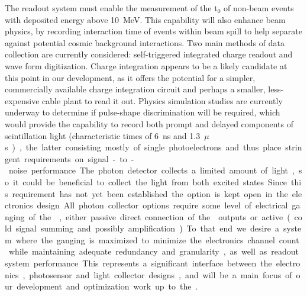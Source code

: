 The readout system must enable the measurement of the t$_0$ of non-beam events with deposited energy above \SI{10}{MeV}. 
This capability will also enhance beam physics, by recording interaction time of events within 
beam spill to help separate against potential cosmic background interactions. Two main methods of data collection are currently considered:  self-triggered integrated charge readout and wave form digitization.  Charge integration appears to be a likely candidate at this point in our development, as it offers the potential for a simpler, commercially available charge integration circuit and perhaps a smaller, less-expensive cable plant to read it out.  Physics simulation studies are currently underway to determine if pulse-shape discrimination will be required, which would provide the capability to record both prompt and delayed components of scintillation light (characteristic times of \SI{6}{ns} and \SI{1.3}{$\mu$s}), the latter consisting mostly of single photoelectrons and thus place stringent requirements on signal-to-noise performance. The photon detector collects a limited amount of light, so it could be beneficial to collect the light from both excited states. 
Since this requirement has not yet been established the option is kept open in the electronics design.

All photon collector options require some level of electrical ganging of the , either passive direct connection of the  outputs or active (cold signal summing and possibly amplification).  To that end we desire a system where the ganging is maximized to minimize the electronics channel count while maintaining adequate redundancy and granularity, as well as readout system performance.  This represents a significant interface between the electronics, photosensor and light collector designs, and will be a main focus of our development and optimization work up to the .

